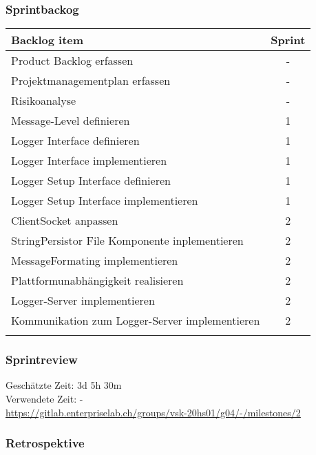 \subsubsection{Sprintbackog}
	\begin{tabularx}{\textwidth}{|p{}|c|}
		\hline
		\textbf{Backlog item} & \textbf{Sprint} \\
		\hline
		Product Backlog erfassen & - \\
		\hline
		Projektmanagementplan erfassen & - \\
		\hline
		Risikoanalyse & - \\
		\hline
		Message-Level definieren & 1
\\
		\hline
		Logger Interface definieren & 1 \\
		\hline
		Logger Interface implementieren & 1
\\
		\hline
		Logger Setup Interface definieren & 1
\\
		\hline
		Logger Setup Interface implementieren & 1
\\
		\hline
		ClientSocket anpassen & 2\\ 
		\hline
		StringPersistor File Komponente inplementieren & 2 \\
		\hline
		MessageFormating implementieren & 2 \\
		\hline
		Plattformunabhängigkeit realisieren & 2 \\
		\hline
		Logger-Server implementieren & 2 \\
		\hline
		Kommunikation zum Logger-Server implementieren & 2 \\
		\hline
		\caption{Sprintbacklog 2}
	\end{tabularx}
\subsubsection{Sprintreview}
Geschätzte Zeit: 3d 5h 30m\\ 
Verwendete Zeit: -
\\
\url{https://gitlab.enterpriselab.ch/groups/vsk-20hs01/g04/-/milestones/2}

\subsubsection{Retrospektive}